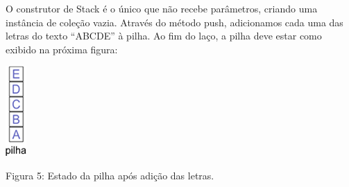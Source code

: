 \documentclass[11pt]{article}
\begin{document}
O construtor de Stack é o único que não recebe parâmetros, criando uma instância de coleção vazia. Através do método push, adicionamos cada uma das letras do texto “ABCDE” à pilha. Ao fim do laço, a pilha deve estar como exibido na próxima figura:

\begin{center}
\includegraphics[width=.9\linewidth]{figura5.png}
\end{center}
Figura 5: Estado da pilha após adição das letras.
\end{document}
